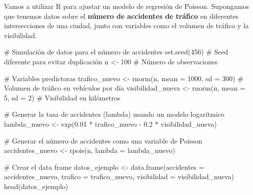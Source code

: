 \documentclass[
  letterpaper,
  DIV=11,
  numbers=noendperiod]{scrreprt}
\newenvironment{Shaded}{\begin{snugshade}}{\end{snugshade}}
\newcommand{\AttributeTok}[1]{\textcolor[rgb]{0.40,0.45,0.13}{#1}}
\newcommand{\CommentTok}[1]{\textcolor[rgb]{0.37,0.37,0.37}{#1}}
\newcommand{\DecValTok}[1]{\textcolor[rgb]{0.68,0.00,0.00}{#1}}
\newcommand{\FloatTok}[1]{\textcolor[rgb]{0.68,0.00,0.00}{#1}}
\newcommand{\FunctionTok}[1]{\textcolor[rgb]{0.28,0.35,0.67}{#1}}
\newcommand{\NormalTok}[1]{\textcolor[rgb]{0.00,0.23,0.31}{#1}}
\newcommand{\OtherTok}[1]{\textcolor[rgb]{0.00,0.23,0.31}{#1}}
\newcommand{\SpecialCharTok}[1]{\textcolor[rgb]{0.37,0.37,0.37}{#1}}
\begin{document}
\begin{tcolorbox}[enhanced jigsaw, leftrule=.75mm, breakable, colbacktitle=quarto-callout-tip-color!10!white, bottomrule=.15mm, colframe=quarto-callout-tip-color-frame, toprule=.15mm, colback=white, coltitle=black, bottomtitle=1mm, left=2mm, title=\textcolor{quarto-callout-tip-color}{\faLightbulb}\hspace{0.5em}{Ejemplo}, opacityback=0, arc=.35mm, opacitybacktitle=0.6, toptitle=1mm, titlerule=0mm, rightrule=.15mm]

Vamos a utilizar R para ajustar un modelo de regresión de Poisson.
Supongamos que tenemos datos sobre el \textbf{número de accidentes de
tráfico} en diferentes intersecciones de una ciudad, junto con variables
como el volumen de tráfico y la visibilidad.

\begin{Shaded}
\begin{Highlighting}[]
\CommentTok{\# Simulación de datos para el número de accidentes}
\FunctionTok{set.seed}\NormalTok{(}\DecValTok{456}\NormalTok{)  }\CommentTok{\# Seed diferente para evitar duplicación}
\NormalTok{n }\OtherTok{\textless{}{-}} \DecValTok{100}  \CommentTok{\# Número de observaciones}

\CommentTok{\# Variables predictoras}
\NormalTok{trafico\_nuevo }\OtherTok{\textless{}{-}} \FunctionTok{rnorm}\NormalTok{(n, }\AttributeTok{mean =} \DecValTok{1000}\NormalTok{, }\AttributeTok{sd =} \DecValTok{300}\NormalTok{)  }\CommentTok{\# Volumen de tráfico en vehículos por día}
\NormalTok{visibilidad\_nueva }\OtherTok{\textless{}{-}} \FunctionTok{rnorm}\NormalTok{(n, }\AttributeTok{mean =} \DecValTok{5}\NormalTok{, }\AttributeTok{sd =} \DecValTok{2}\NormalTok{)   }\CommentTok{\# Visibilidad en kilómetros}

\CommentTok{\# Generar la tasa de accidentes (lambda) usando un modelo logarítmico}
\NormalTok{lambda\_nuevo }\OtherTok{\textless{}{-}} \FunctionTok{exp}\NormalTok{(}\FloatTok{0.01} \SpecialCharTok{*}\NormalTok{ trafico\_nuevo }\SpecialCharTok{{-}} \FloatTok{0.2} \SpecialCharTok{*}\NormalTok{ visibilidad\_nueva)}

\CommentTok{\# Generar el número de accidentes como una variable de Poisson}
\NormalTok{accidentes\_nuevo }\OtherTok{\textless{}{-}} \FunctionTok{rpois}\NormalTok{(n, }\AttributeTok{lambda =}\NormalTok{ lambda\_nuevo)}

\CommentTok{\# Crear el data frame}
\NormalTok{datos\_ejemplo }\OtherTok{\textless{}{-}} \FunctionTok{data.frame}\NormalTok{(}\AttributeTok{accidentes =}\NormalTok{ accidentes\_nuevo, }\AttributeTok{trafico =}\NormalTok{ trafico\_nuevo, }\AttributeTok{visibilidad =}\NormalTok{ visibilidad\_nueva)}
\FunctionTok{head}\NormalTok{(datos\_ejemplo)}
\end{Highlighting}
\end{Shaded}


\end{tcolorbox}
\end{document}
